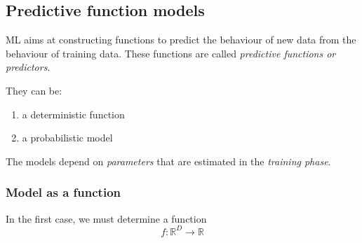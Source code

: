 \subsection{Predictive function models}

ML aims at constructing functions to predict the behaviour of new data from the behaviour of training data. These functions are called \textit{predictive functions or predictors}.

They can be:
\begin{enumerate}
    \item a deterministic function
    \item a probabilistic model
\end{enumerate}

The models depend on \textit{parameters} that are estimated in the \textit{training phase}.

\subsubsection{Model as a function}

In the first case, we must determine a function 
$$f:\mathbb{R}^D \longrightarrow \mathbb{R}$$
